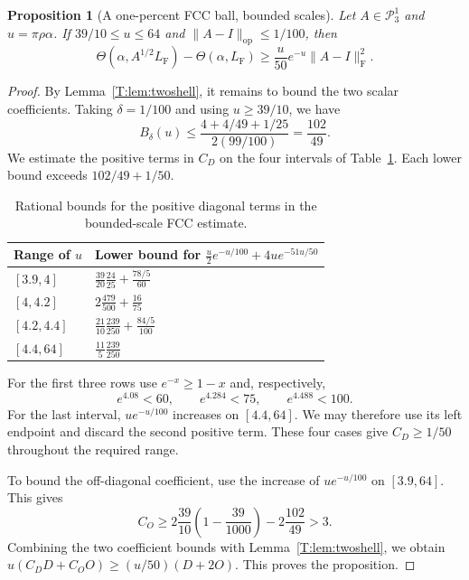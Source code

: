 \documentclass[reqno,english]{amsart}
\newtheorem{proposition}[theorem]{Proposition}
\theoremstyle{definition}
\newtheorem{open problem}[theorem]{Open Problem}
\theoremstyle{remark}
\theoremstyle{plain}
\numberwithin{equation}{section}
\newcommand{\FCC}{L_{\mathrm F}}
\newcommand{\PP}{\mathcal P_3^1}
\newcommand{\op}{\mathrm{op}}
\newcommand{\frob}{\mathrm F}
\newcommand{\Th}{\Theta}
\newcommand{\Id}{I}
\begin{document}
\begin{proposition}[A one-percent FCC ball, bounded scales]\label{T:prop:smallballbounded}
Let $A\in\PP$ and $u=\pi\rho\alpha$. If $39/10\le u\le64$ and $\|A-\Id\|_{\op}\le1/100$, then
\begin{equation}\label{T:eq:localquant}
 \Th(\alpha,A^{1/2}\FCC)-\Th(\alpha,\FCC)
 \ge\frac{u}{50}e^{-u}\|A-\Id\|_{\frob}^2.
\end{equation}
\end{proposition}
\begin{proof}
By Lemma~\ref{T:lem:twoshell}, it remains to bound the two scalar
coefficients. Taking $\delta=1/100$ and using $u\ge39/10$, we have
\[
 B_\delta(u)\le\frac{4+4/49+1/25}{2(99/100)}=\frac{102}{49}.
\]
We estimate the positive terms in $C_D$ on the four intervals of
Table~\ref{T:tab:diagonal-bounds}. Each lower bound exceeds
$102/49+1/50$.
\begin{table}[!htbp]
\centering
\caption{Rational bounds for the positive diagonal terms in the bounded-scale FCC estimate.}\label{T:tab:diagonal-bounds}
\begin{tabular}{@{}ll@{}}
\toprule
Range of $u$ & Lower bound for $\frac u2e^{-u/100}+4ue^{-51u/50}$\\
\midrule
$[3.9,4]$ & $\frac{39}{20}\frac{24}{25}+\frac{78/5}{60}$\\[2pt]
$[4,4.2]$ & $2\frac{479}{500}+\frac{16}{75}$\\[2pt]
$[4.2,4.4]$ & $\frac{21}{10}\frac{239}{250}+\frac{84/5}{100}$\\[2pt]
$[4.4,64]$ & $\frac{11}{5}\frac{239}{250}$\\
\bottomrule
\end{tabular}
\end{table}

For the first three rows use $e^{-x}\ge1-x$ and, respectively,
\[
 e^{4.08}<60,\qquad e^{4.284}<75,\qquad e^{4.488}<100.
\]
For the last interval, $u e^{-u/100}$ increases on $[4.4,64]$.
We may therefore use its left endpoint and discard the second positive
term. These four cases give $C_D\ge1/50$ throughout the required
range.

To bound the off-diagonal coefficient, use the increase of
$u e^{-u/100}$ on $[3.9,64]$. This gives
\[
 C_O\ge2\frac{39}{10}\left(1-\frac{39}{1000}\right)
          -2\frac{102}{49}>3.
\]
Combining the two coefficient bounds with
Lemma~\ref{T:lem:twoshell}, we obtain
$u(C_DD+C_OO)\ge(u/50)(D+2O)$. This proves the proposition.
\end{proof}
\end{document}

